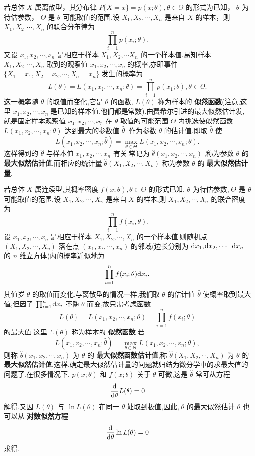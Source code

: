 \documentclass[UTF8,10pt]{ctexart}
\begin{document}
	若总体 $ X $ 属离散型，其分布律 $ P\{X=x\}=p(x; \theta ), \theta \in \Theta $ 的形式为已知， $ \theta $ 为待估参数， $ \Theta $ 是 $ \theta $ 可能取值的范围.设 $ X_{1},X_{2}, \cdots ,X_{n} $ 是来自 $ X $ 的样本，则 $ X_{1},X_{2}, \cdots ,X_{n} $ 的联合分布律为 $$ \prod_{i=1}^{n}p(x_{i}; \theta ). $$ 又设 $ x_{1},x_{2}, \cdots ,x_{n} $ 是相应于样本 $ X_{1},X_{2}, \cdots X_{n} $ 的一个样本值.易知样本 $ X_{1},X_{2}, \cdots ,X_{n} $ 取到的观察值 $ x_{1},x_{2}, \cdots ,x_{n} $ 的概率,亦即事件 $ \{X_{1}=x_{1},X_{2}=x_{2}, \cdots ,X_{n}=x_{n} \} $ 发生的概率为 $$ L( \theta )=L(x_{1},x_{2}, \cdots ,x_{n}; \theta )= \prod_{i=1}^{n} p(x_{1}; \theta ), \theta \in \Theta. $$ 这一概率随 $ \theta $ 的取值而变化,它是 $ \theta $ 的函数, $ L( \theta ) $ 称为样本的 \textbf{似然函数}(注意,这里 $ x_{1},x_{2}, \cdots ,x_{n} $ 是已知的样本值,他们都是常数).由费希尔引进的最大似然估计发,就是固定样本观察值 $ x_{1},x_{2}, \cdots ,x_{n} $ 在 $ \theta $ 取值的可能范围 $ \Theta $ 内挑选使似然函数 $ L(x_{1},x_{2}, \cdots ,x_{n}; \theta ) $ 达到最大的参数值 $ \hat{ \theta } $ ,作为参数 $ \theta $ 的估计值.即取 $ \hat{ \theta } $ 使 $$ L(x_{1},x_{2}, \cdots ,x_{n}; \hat{ \theta })=\max\limits_{ \theta \in \Theta } L(x_{1},x_{2}, \cdots ,x_{n}; \theta ). $$ 这样得到的 $ \hat{ \theta } $ 与样本值 $ x_{1},x_{2}, \cdots ,x_{n} $ 有关,常记为 $ \hat{ \theta }(x_{1},x_{2}, \cdots ,x_{n}) $ ,称为参数 $ \theta $ 的 \textbf{最大似然估计值}.而相应的统计量 $ \hat{ \theta } (X_{1},X_{2}, \cdots ,X_{n}) $ 称为参数 $ \theta $ 的 \textbf{最大似然估计量}.
	
	若总体 $ X $ 属连续型,其概率密度 $ f(x; \theta ), \theta \in \Theta $ 的形式已知, $ \theta $ 为待估参数, $ \Theta $ 是 $ \theta $ 可能取值的范围.设 $ X_{1},X_{2}, \cdots ,X_{n} $ 是来自 $ X $ 的样本,则 $ X_{1},X_{2}, \cdots ,X_{n} $ 的联合密度为 $$ \prod_{i=1}^{n}f(x_{i}, \theta ). $$ 设 $ x_{1},x_{2}, \cdots ,x_{n} $ 是相应于样本 $ X_{1},X_{2}, \cdots ,X_{n} $ 的一个样本值,则随机点 $ (X_{1},X_{2}, \cdots ,X_{n}) $ 落在点 $ (x_{1},x_{2}, \cdots ,x_{n}) $ 的邻域(边长分别为 $ {\rm d}x_{1},{\rm d}x_{2}, \cdots ,{\rm d}x_{n} $ 的 $ n $ 维立方体)内的概率近似地为 $$ \prod_{i=1}^{n} f(x_{i}; \theta ){\rm d}x_{i}. $$ 其值岁 $ \theta $ 的取值而变化.与离散型的情况一样,我们取 $ \theta $ 的估计值 $ \hat{ \theta } $ 使概率取到最大值,但因子 $ \prod_{i=1}^{n}{\rm d}x_{i} $ 不随 $ \theta $ 而变,故只需考虑函数 $$ L( \theta )=L(x_{1},x_{2}, \cdots ,x_{n}; \theta )= \prod_{i=1}^{n}f(x_{i}; \theta ) $$ 的最大值.这里 $ L( \theta ) $ 称为样本的 \textbf{似然函数}.若 $$ L(x_{1},x_{2}, \cdots ,x_{n}; \hat{ \theta })= \max\limits_{ \theta \in \Theta }L(x_{1},x_{2}, \cdots ,x_{n}; \theta ), $$ 则称 $ \hat{ \theta }(x_{1},x_{2}, \cdots ,x_{n}) $ 为 $ \theta $ 的 \textbf{最大似然函数估计值},称 $ \hat{ \theta }(X_{1},X_{2}, \cdots ,X_{n}) $ 为 $ \theta $ 的 \textbf{最大似然估计值}.这样,确定最大似然估计量的问题就归结为微分学中的求最大值的问题了.在很多情况下, $ p(x; \theta ) $ 和 $ f(x; \theta ) $ 关于 $ \theta $ 可微,这是 $ \hat{ \theta } $ 常可从方程 $$ \frac{\rm d}{{\rm d} \theta } L( \theta )=0 $$ 解得.又因 $ L( \theta ) $ 与 $ \ln L( \theta ) $ 在同一 $ \theta $ 处取到极值,因此, $ \theta $ 的最大似然估计 $ \theta $ 也可以从 \textbf{对数似然方程} $$ \frac{\rm d}{{\rm d} \theta } \ln L( \theta )=0 $$ 求得.
	
\end{document}
